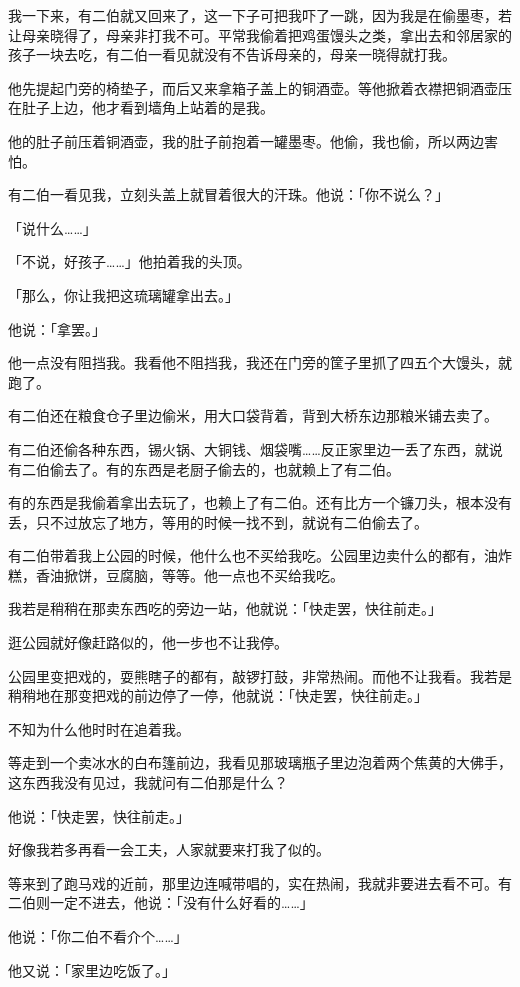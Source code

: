 \documentclass[UTF8]{ctexart}
\begin{document}
我一下来，有二伯就又回来了，这一下子可把我吓了一跳，因为我是在偷墨枣，若让母亲晓得了，母亲非打我不可。平常我偷着把鸡蛋馒头之类，拿出去和邻居家的孩子一块去吃，有二伯一看见就没有不告诉母亲的，母亲一晓得就打我。

他先提起门旁的椅垫子，而后又来拿箱子盖上的铜酒壶。等他掀着衣襟把铜酒壶压在肚子上边，他才看到墙角上站着的是我。

他的肚子前压着铜酒壶，我的肚子前抱着一罐墨枣。他偷，我也偷，所以两边害怕。

有二伯一看见我，立刻头盖上就冒着很大的汗珠。他说：「你不说么？」

「说什么……」

「不说，好孩子……」他拍着我的头顶。

「那么，你让我把这琉璃罐拿出去。」

他说：「拿罢。」

他一点没有阻挡我。我看他不阻挡我，我还在门旁的筐子里抓了四五个大馒头，就跑了。

有二伯还在粮食仓子里边偷米，用大口袋背着，背到大桥东边那粮米铺去卖了。

有二伯还偷各种东西，锡火锅、大铜钱、烟袋嘴……反正家里边一丢了东西，就说有二伯偷去了。有的东西是老厨子偷去的，也就赖上了有二伯。

有的东西是我偷着拿出去玩了，也赖上了有二伯。还有比方一个镰刀头，根本没有丢，只不过放忘了地方，等用的时候一找不到，就说有二伯偷去了。

有二伯带着我上公园的时候，他什么也不买给我吃。公园里边卖什么的都有，油炸糕，香油掀饼，豆腐脑，等等。他一点也不买给我吃。

我若是稍稍在那卖东西吃的旁边一站，他就说：「快走罢，快往前走。」

逛公园就好像赶路似的，他一步也不让我停。

公园里变把戏的，耍熊瞎子的都有，敲锣打鼓，非常热闹。而他不让我看。我若是稍稍地在那变把戏的前边停了一停，他就说：「快走罢，快往前走。」

不知为什么他时时在追着我。

等走到一个卖冰水的白布篷前边，我看见那玻璃瓶子里边泡着两个焦黄的大佛手，这东西我没有见过，我就问有二伯那是什么？

他说：「快走罢，快往前走。」

好像我若多再看一会工夫，人家就要来打我了似的。

等来到了跑马戏的近前，那里边连喊带唱的，实在热闹，我就非要进去看不可。有二伯则一定不进去，他说：「没有什么好看的……」

他说：「你二伯不看介个……」

他又说：「家里边吃饭了。」
\end{document}
